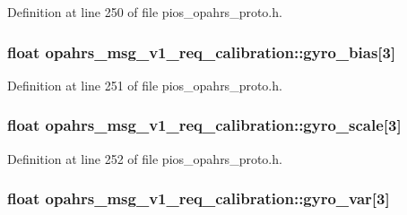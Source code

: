 Definition at line 250 of file pios\-\_\-opahrs\-\_\-proto.\-h.

\hypertarget{structopahrs__msg__v1__req__calibration_a1b56b59417cb99e78b7b484d9bcbf979}{
\subsubsection[{gyro\-\_\-bias}]{\setlength{\rightskip}{0pt plus 5cm}float opahrs\-\_\-msg\-\_\-v1\-\_\-req\-\_\-calibration\-::gyro\-\_\-bias\mbox{[}3\mbox{]}}}\label{structopahrs__msg__v1__req__calibration_a1b56b59417cb99e78b7b484d9bcbf979}


Definition at line 251 of file pios\-\_\-opahrs\-\_\-proto.\-h.

\hypertarget{structopahrs__msg__v1__req__calibration_a1254f496d91bf385d5b86ac13d8492db}{
\subsubsection[{gyro\-\_\-scale}]{\setlength{\rightskip}{0pt plus 5cm}float opahrs\-\_\-msg\-\_\-v1\-\_\-req\-\_\-calibration\-::gyro\-\_\-scale\mbox{[}3\mbox{]}}}\label{structopahrs__msg__v1__req__calibration_a1254f496d91bf385d5b86ac13d8492db}


Definition at line 252 of file pios\-\_\-opahrs\-\_\-proto.\-h.

\hypertarget{structopahrs__msg__v1__req__calibration_a477198c748876fb9a1409096faac0a23}{
\subsubsection[{gyro\-\_\-var}]{\setlength{\rightskip}{0pt plus 5cm}float opahrs\-\_\-msg\-\_\-v1\-\_\-req\-\_\-calibration\-::gyro\-\_\-var\mbox{[}3\mbox{]}}}\label{structopahrs__msg__v1__req__calibration_a477198c748876fb9a1409096faac0a23}


